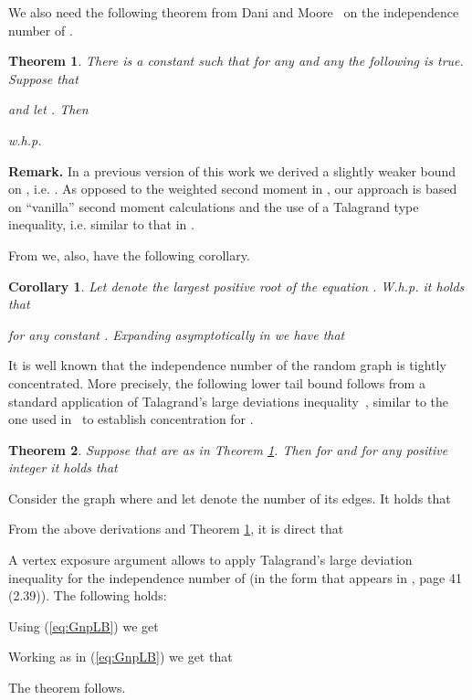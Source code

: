 \documentclass[a4paper,10pt]{article}
\makeatletter
\newtheorem{corollary}{Corollary}\renewcommand{\thecorollary}{\arabic{corollary}}
\newtheorem{theorem}{Theorem}\renewcommand{\thetheorem}{\arabic{theorem}}
\newenvironment{proof}{\noindent{\bf Proof\@:}}{\hfill \\}
\newcommand{\whp}{w.h.p.}
\newcommand\Sec{Section}
\makeatother
\begin{document}
\noindent
We also need the following theorem from Dani and Moore~\cite{W2ndM} on
the independence number of .
\begin{theorem}\label{lemma:SMBound}
There is a constant  such that
for any  and any  the following is true.
Suppose that

and let .
Then

\whp
\end{theorem}

\noindent
{\bf Remark.}
In a previous version of this work \cite{arxivTR} we derived a slightly 
weaker bound on , i.e. . 
As opposed to the weighted second moment in \cite{W2ndM}, 
our approach is based on  ``vanilla'' second moment calculations and the
use of a Talagrand type inequality, i.e. similar to that in \cite{frieze-is}.
\\ \vspace{-.3cm}

\noindent
From \cite{W2ndM} we, also, have the following corollary.

\begin{corollary}\label{cor:SMBoundRev}
Let  denote the largest positive root  of the equation
. W.h.p. it holds that

for any constant . Expanding  asymptotically in  
we have that

\end{corollary}

\noindent
It is well known that the independence number  of
the random graph is tightly concentrated. More precisely, the following 
lower tail  bound follows from a standard application of Talagrand's
large deviations inequality~\cite{TalagrandIneq}, similar to the
one used in~\cite[\Sec~7.1]{janson} to establish concentration for
.

\begin{theorem}\label{thrm:TalagrandTailBound}
Suppose that  are as in Theorem \ref{lemma:SMBound}. 
Then for  and for any positive integer  
it holds that
	
\end{theorem}
\begin{proof}
Consider the graph  where  and let 
denote the number of its edges. It holds that

From the above derivations and Theorem \ref{lemma:SMBound}, 
it is direct that

A vertex exposure argument allows to apply Talagrand's large 
deviation inequality for the independence number of 
(in the form that appears in \cite{janson}, page 41 (2.39)).
The following holds:

Using (\ref{eq:GnpLB}) we get

Working as in (\ref{eq:GnpLB}) we get that

The theorem follows.
\end{proof}
\end{document}
